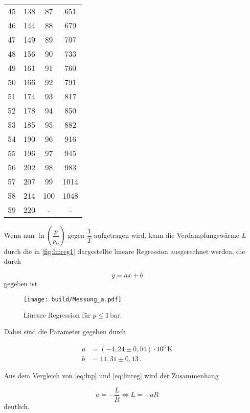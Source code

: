 \begin{table}[H]
\begin{tabular}{S[table-format=2.0] S[table-format=3.0] S[table-format=3.0] S[table-format=3.0]}
            45 & 138 & 87  & 651  \\
            46 & 144 & 88  & 679  \\
            47 & 149 & 89  & 707  \\
            48 & 156 & 90  & 733  \\
            49 & 161 & 91  & 760  \\
            50 & 166 & 92  & 791  \\
            51 & 174 & 93  & 817  \\
            52 & 178 & 94  & 850  \\
            53 & 185 & 95  & 882  \\
            54 & 190 & 96  & 916  \\
            55 & 196 & 97  & 945  \\
            56 & 202 & 98  & 983  \\
            57 & 207 & 99  & 1014 \\
            58 & 214 & 100 & 1048 \\
            59 & 220 & {-} & {-}  \\
      \bottomrule
    \end{tabular}
  \end{table}

Wenn nun $\ln{\left(\dfrac{p}{p_0} \right)}$ gegen $\dfrac{1}{T}$ aufgetragen wird, kann die Verdampfungswärme $L$ durch die in \autoref{fig:linreg1} dargestellte lineare Regression ausgerechnet werden, die durch

\begin{equation}
  y = a x + b
  \label{eq:linreg}
\end{equation} gegeben ist.

\begin{figure}
  \centering
  \texttt{[image: build/Messung\_a.pdf]}
  \caption{Lineare Regression für $p \leq 1 \,\unit{\bar}$.}
  \label{fig:linreg1}
\end{figure}

Dabei sind die Parameter gegeben durch 

\begin{align*}
a & = (-4,24  \pm 0,04) \cdot 10^3 \, \unit{\kelvin}\\
b & = 11,31   \pm 0,13 \,.
\end{align*}

Aus dem Vergleich von \eqref{eq:lnp} und \eqref{eq:linreg} wird der Zusammenhang

\begin{equation*}
  a = - \frac{L}{R} \Leftrightarrow L = -a R
\end{equation*} deutlich.

